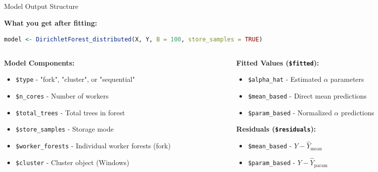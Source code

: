 \documentclass[aspectratio=169]{beamer}
\begin{document}
\begin{frame}[fragile]{Model Output Structure}

\textbf{What you get after fitting:}

\vspace{0.3cm}

\begin{lstlisting}[language=R, basicstyle=\tiny\ttfamily]
model <- DirichletForest_distributed(X, Y, B = 100, store_samples = TRUE)
\end{lstlisting}

\vspace{0.3cm}

\begin{columns}[T]

\begin{column}{0.48\textwidth}
\textbf{Model Components:}
\begin{itemize}
\item \texttt{\$type} - "fork", "cluster", or "sequential"
\item \texttt{\$n\_cores} - Number of workers
\item \texttt{\$total\_trees} - Total trees in forest
\item \texttt{\$store\_samples} - Storage mode
\item \texttt{\$worker\_forests} - Individual worker forests (fork)
\item \texttt{\$cluster} - Cluster object (Windows)
\end{itemize}
\end{column}

\begin{column}{0.48\textwidth}
\textbf{Fitted Values (\texttt{\$fitted}):}
\begin{itemize}
\item \texttt{\$alpha\_hat} - Estimated $\alpha$ parameters
\item \texttt{\$mean\_based} - Direct mean predictions
\item \texttt{\$param\_based} - Normalized $\alpha$ predictions
\end{itemize}

\vspace{0.2cm}

\textbf{Residuals (\texttt{\$residuals}):}
\begin{itemize}
\item \texttt{\$mean\_based} - $Y - \hat{Y}_{\text{mean}}$
\item \texttt{\$param\_based} - $Y - \hat{Y}_{\text{param}}$
\end{itemize}
\end{column}

\end{columns}

\end{frame}
\end{document}
